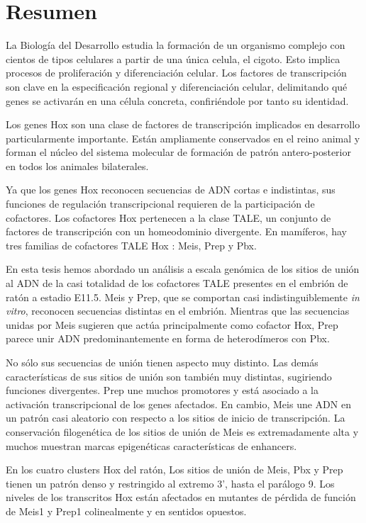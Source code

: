\chapter{Resumen}

La Biología del Desarrollo estudia la formación de un organismo complejo con cientos de tipos celulares a partir de una única celula, el cigoto. Esto implica procesos de proliferación y diferenciación celular. Los factores de transcripción son clave en la especificación regional y diferenciación celular, delimitando qué genes se activarán en una célula concreta, confiriéndole por tanto su identidad. 

Los genes Hox son una clase de factores de transcripción implicados en desarrollo particularmente importante. Están ampliamente conservados en el reino animal y forman el núcleo del sistema molecular de formación de patrón antero-posterior en todos los animales bilaterales. 

Ya que los genes Hox reconocen secuencias de ADN cortas e indistintas, sus funciones de regulación transcripcional requieren de la participación de cofactores. Los cofactores Hox pertenecen a la clase TALE, un conjunto de factores de transcripción con un homeodominio divergente. En mamíferos, hay tres familias de cofactores TALE Hox : Meis, Prep y Pbx. 

En esta tesis hemos abordado un análisis a escala genómica de los sitios de unión al ADN de la casi totalidad de los cofactores TALE presentes en el embrión de ratón a estadio E11.5. Meis y Prep, que se comportan casi indistinguiblemente \textit{in vitro}, reconocen secuencias distintas en el embrión. Mientras que las secuencias unidas por Meis sugieren que actúa principalmente como cofactor Hox, Prep parece unir ADN predominantemente en forma de heterodímeros con Pbx. 

No sólo sus secuencias de unión tienen aspecto muy distinto. Las demás características de sus sitios de unión son también muy distintas, sugiriendo funciones divergentes. Prep une muchos promotores y está asociado a la activación transcripcional de los genes afectados. En cambio, Meis une ADN en un patrón casi aleatorio con respecto a los sitios de inicio de transcripción. La conservación filogenética de los sitios de unión de Meis es extremadamente alta y muchos muestran marcas epigenéticas características de enhancers. 

En los cuatro clusters Hox del ratón, Los sitios de unión de Meis, Pbx y Prep tienen un patrón denso y restringido al extremo 3', hasta el parálogo 9. Los niveles de los transcritos Hox están afectados en mutantes de pérdida de función de Meis1 y Prep1 colinealmente y en sentidos opuestos.

